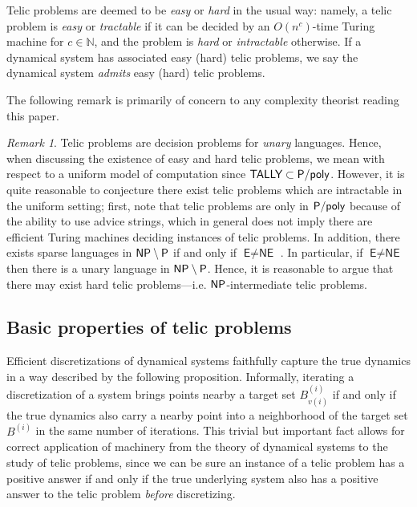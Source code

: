 \documentclass{amsart}
\theoremstyle{theorem}
\theoremstyle{remark}
\newtheorem{remark}[theorem]{Remark}
\numberwithin{equation}{section}
\newcommand{\NN}{\mathbb{N}}
\newcommand{\ccP}{\textsf{\upshape P}}
\newcommand{\ccNP}{\textsf{\upshape NP}}
\newcommand{\ccPpoly}{\textsf{\upshape P/poly}}
\begin{document}
Telic problems are deemed to be \emph{easy} or \emph{hard} in the usual way: namely, a telic problem is \emph{easy} or \emph{tractable} if it can be decided by an $O(n^c)$-time Turing machine for $c \in \NN$, and the problem is \emph{hard} or \emph{intractable} otherwise. If a dynamical system has associated easy (hard) telic problems, we say the dynamical system \emph{admits} easy (hard) telic problems.

The following remark is primarily of concern to any complexity theorist reading this paper.

\begin{remark}\label{remTally}
Telic problems are decision problems for \emph{unary} languages. Hence, when discussing the existence of easy and hard telic problems, we mean with respect to a uniform model of computation since $\textsf{TALLY} \subset \ccPpoly$.
However, it is quite reasonable to conjecture there exist telic problems which are intractable in the uniform setting; first, note that telic problems are only in $\ccPpoly$ because of the ability to use advice strings, which in general does not imply there are efficient Turing machines deciding instances of telic problems.
In addition, there exists sparse languages in $\ccNP\setminus \ccP$ if and only if $\textsf{E} \neq \textsf{NE}$ \cite{hartmanis1983sparse}. In particular, if $\textsf{E} \neq \textsf{NE}$ then there is a unary language in $\ccNP\setminus \ccP$. Hence, it is reasonable to argue that there may exist hard telic problems---i.e. $\ccNP$-intermediate telic problems.
\end{remark}

\subsection{Basic properties of telic problems}
Efficient discretizations of dynamical systems faithfully capture the true dynamics in a way described by the following proposition. Informally, iterating a discretization of a system brings points nearby a target set $B^{(i)}_{v(i)}$ if and only if the true dynamics also carry a nearby point into a neighborhood of the target set $B^{(i)}$ in the same number of iterations.
This trivial but important fact allows for correct application of machinery from the theory of dynamical systems to the study of telic problems, since we can be sure an instance of a telic problem has a positive answer if and only if the true underlying system also has a positive answer to the telic problem \emph{before} discretizing.
\end{document}
